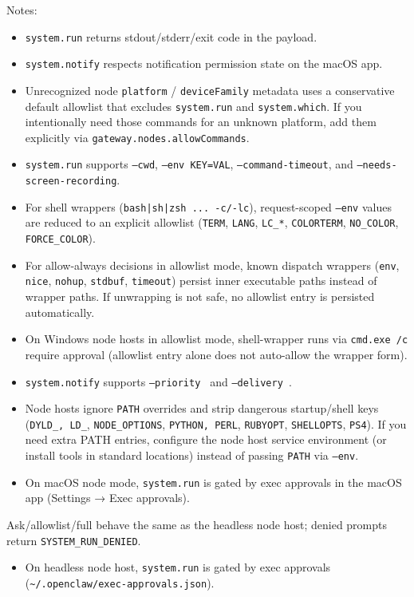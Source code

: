 Notes:

\begin{itemize}
  \item \texttt{system.run} returns stdout/stderr/exit code in the payload.
  \item \texttt{system.notify} respects notification permission state on the macOS app.
  \item Unrecognized node \texttt{platform} / \texttt{deviceFamily} metadata uses a conservative default allowlist that excludes \texttt{system.run} and \texttt{system.which}. If you intentionally need those commands for an unknown platform, add them explicitly via \texttt{gateway.nodes.allowCommands}.
  \item \texttt{system.run} supports \texttt{--cwd}, \texttt{--env KEY=VAL}, \texttt{--command-timeout}, and \texttt{--needs-screen-recording}.
  \item For shell wrappers (\texttt{bash|sh|zsh ... -c/-lc}), request-scoped \texttt{--env} values are reduced to an explicit allowlist (\texttt{TERM}, \texttt{LANG}, \texttt{LC\_*}, \texttt{COLORTERM}, \texttt{NO\_COLOR}, \texttt{FORCE\_COLOR}).
  \item For allow-always decisions in allowlist mode, known dispatch wrappers (\texttt{env}, \texttt{nice}, \texttt{nohup}, \texttt{stdbuf}, \texttt{timeout}) persist inner executable paths instead of wrapper paths. If unwrapping is not safe, no allowlist entry is persisted automatically.
  \item On Windows node hosts in allowlist mode, shell-wrapper runs via \texttt{cmd.exe /c} require approval (allowlist entry alone does not auto-allow the wrapper form).
  \item \texttt{system.notify} supports \texttt{--priority } and \texttt{--delivery }.
  \item Node hosts ignore \texttt{PATH} overrides and strip dangerous startup/shell keys (\texttt{DYLD\_\textit{}, \texttt{LD\_}}, \texttt{NODE\_OPTIONS}, \texttt{PYTHON\textit{}, \texttt{PERL}}, \texttt{RUBYOPT}, \texttt{SHELLOPTS}, \texttt{PS4}). If you need extra PATH entries, configure the node host service environment (or install tools in standard locations) instead of passing \texttt{PATH} via \texttt{--env}.
  \item On macOS node mode, \texttt{system.run} is gated by exec approvals in the macOS app (Settings → Exec approvals).
\end{itemize}

Ask/allowlist/full behave the same as the headless node host; denied prompts return \texttt{SYSTEM\_RUN\_DENIED}.
\begin{itemize}
  \item On headless node host, \texttt{system.run} is gated by exec approvals (\texttt{\textasciitilde{}/.openclaw/exec-approvals.json}).
\end{itemize}


